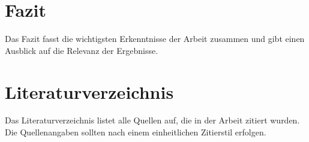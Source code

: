\section{Fazit}
Das Fazit fasst die wichtigsten Erkenntnisse der Arbeit zusammen und gibt einen Ausblick auf die Relevanz der Ergebnisse.

\section{Literaturverzeichnis}
Das Literaturverzeichnis listet alle Quellen auf, die in der Arbeit zitiert wurden. Die Quellenangaben sollten nach einem einheitlichen Zitierstil erfolgen.
